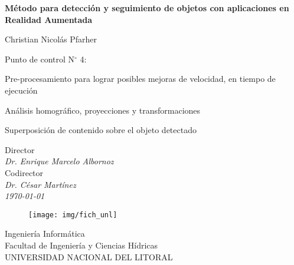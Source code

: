 \documentclass[a4paper,11pt,spanish]{article}
\begin{document}
\pagestyle{empty}
\begin{center}

	\bigskip
	\bigskip
	
	{\bf\Large Método para detección y seguimiento de objetos con aplicaciones en Realidad Aumentada} \\

	\bigskip
	\bigskip

	\large Christian Nicolás Pfarher\\


  	\bigskip
  	\bigskip
	
	Punto de control N$^{\circ}$ 4: \\	
		\begin{description}
			\item Pre-procesamiento para lograr posibles mejoras de velocidad, en tiempo de ejecución
			\item Análisis homográfico, proyecciones y transformaciones
			\item Superposición de contenido sobre el objeto detectado
		\end{description}

	 
	\bigskip
	
	Director\\
	\textit{Dr. Enrique Marcelo Albornoz}\\
	\bigskip
	Codirector\\
	\textit{Dr. César Martínez}\\
	
	\bigskip
	\bigskip
	\bigskip
	\bigskip
	\bigskip
	\bigskip
	\textit{\today}\\
	

	\vfill
	\begin{figure}[tbhp]
		\centerline{\texttt{[image: img/fich\_unl]}}
	\end{figure}
	
  	{Ingeniería Informática}\\
  	{Facultad de Ingeniería y Ciencias Hídricas}\\
    {UNIVERSIDAD NACIONAL DEL LITORAL}	
\end{center}

\bigskip
\bigskip
\end{document}
